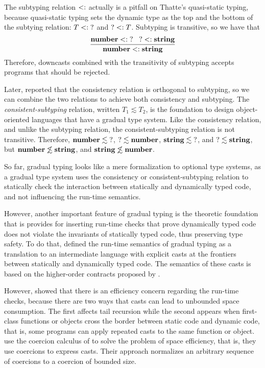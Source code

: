 The subtyping relation $<:$ actually is a pitfall on Thatte's
quasi-static typing, because quasi-static typing sets the dynamic type
as the top and the bottom of the subtying relation:
$T <: \;?$ and $? <: T$.
Subtyping is transitive, so we have that
\[
\frac{\mathbf{number} <: \;? \;\;\;
      ? <: \mathbf{string}}
     {\mathbf{number} <: \mathbf{string}}
\]
Therefore, downcasts combined with the transitivity of subtyping
accepts programs that should be rejected.

Later, \citet{siek2007objects} reported that the consistency relation
is orthogonal to subtyping, so we can combine the two relations to
achieve both consistency and subtyping.
The \emph{consistent-subtyping} relation,
written $T_{1} \lesssim T_{2}$,
is the foundation to design object-oriented languages that have a
gradual type system.
Like the consistency relation, and unlike the subtyping relation,
the consistent-subtyping relation is not transitive.
Therefore, $\mathbf{number} \lesssim \;?$, $? \lesssim \mathbf{number}$,
$\mathbf{string} \lesssim \;?$, and $? \lesssim \mathbf{string}$,
but $\mathbf{number} \not\lesssim \mathbf{string}$, and
$\mathbf{string} \not\lesssim \mathbf{number}$.

So far, gradual typing looks like a mere formalization to optional
type systems, as a gradual type system uses the consistency or
consistent-subtyping relation to statically check the interaction
between statically and dynamically typed code, and not influencing
the run-time semantics.

However, another important feature of gradual typing is the theoretic
foundation that is provides for inserting run-time checks that
prove dynamically typed code does not violate the invariants of
statically typed code, thus preserving type safety.
To do that, \citet{siek2006gradual,siek2007objects} defined the
run-time semantics of gradual typing as a translation to an
intermediate language with explicit casts at the frontiers between
statically and dynamically typed code.
The semantics of these casts is based on the higher-order contracts
proposed by \citet{findler2002chf}.

However, \citet{herman2007sgt} showed that there is an efficiency
concern regarding the run-time checks, because there are two
ways that casts can lead to unbounded space consumption.
The first affects tail recursion while the second appears when
first-class functions or objects cross the border between
static code and dynamic code, that is, some programs can apply
repeated casts to the same function or object.
\citet{herman2007sgt} use the coercion calculus of
\citet{henglein1994dts} to solve the problem of space efficiency,
that is, they use coercions to express casts.
Their approach normalizes an arbitrary sequence of coercions to a
coercion of bounded size.

